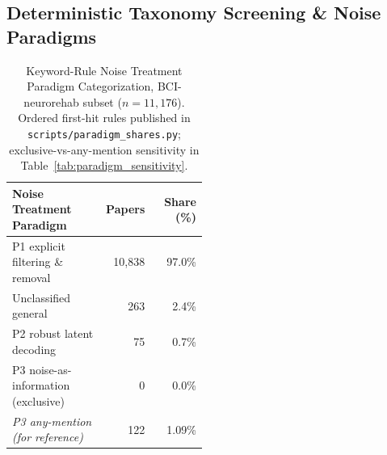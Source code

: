 \subsection{Deterministic Taxonomy Screening \& Noise Paradigms}
\begin{table}[htbp]
\caption{Keyword-Rule Noise Treatment Paradigm Categorization, BCI-neurorehab subset ($n=11{,}176$). Ordered first-hit rules published in \nolinkurl{scripts/paradigm_shares.py}; exclusive-vs-any-mention sensitivity in Table~\ref{tab:paradigm_sensitivity}.}
\label{tab:llm_screening}
\small
\begin{tabular}{p{0.48\linewidth} r r}
\toprule
\textbf{Noise Treatment Paradigm} & \textbf{Papers} & \textbf{Share (\%)} \\
\midrule
P1 explicit filtering \& removal & 10,838 & 97.0\% \\
Unclassified general & 263 & 2.4\% \\
P2 robust latent decoding & 75 & 0.7\% \\
P3 noise-as-information (exclusive) & 0 & 0.0\% \\
\midrule
\textit{P3 any-mention (for reference)} & 122 & 1.09\% \\
\bottomrule
\end{tabular}
\end{table}
